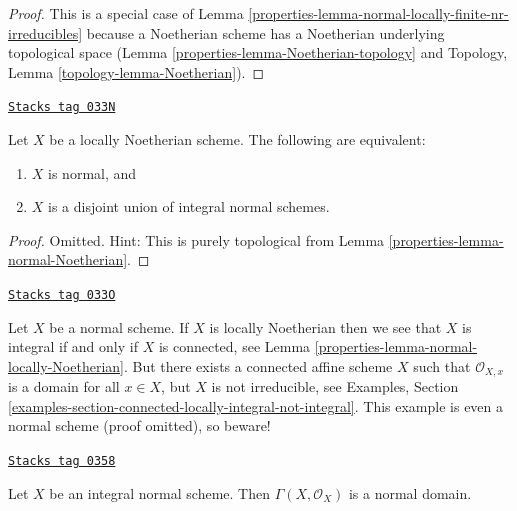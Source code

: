 \begin{proof}

This is a special case of
Lemma \ref{properties-lemma-normal-locally-finite-nr-irreducibles} because a Noetherian
scheme has a Noetherian underlying topological space
(Lemma \ref{properties-lemma-Noetherian-topology}
and
Topology, Lemma \ref{topology-lemma-Noetherian}).
\end{proof}

\begin{lemma}
\label{properties-lemma-normal-locally-Noetherian}
\href{https://stacks.math.columbia.edu/tag/033N}{\texttt{Stacks tag 033N}}

Let $X$ be a locally Noetherian scheme.
The following are equivalent:
\begin{enumerate}
\item $X$ is normal, and
\item $X$ is a disjoint union of integral normal schemes.
\end{enumerate}
\end{lemma}

\begin{proof}

Omitted. Hint: This is purely topological from
Lemma \ref{properties-lemma-normal-Noetherian}.
\end{proof}

\begin{remark}
\label{properties-remark-normal-connected-irreducible}
\href{https://stacks.math.columbia.edu/tag/033O}{\texttt{Stacks tag 033O}}

Let $X$ be a normal scheme. If $X$ is locally Noetherian then we see that
$X$ is integral if and only if $X$ is connected, see
Lemma \ref{properties-lemma-normal-locally-Noetherian}.
But there exists a connected affine scheme $X$ such that
$\mathcal{O}_{X, x}$ is a domain for all $x \in X$, but $X$ is not
irreducible, see Examples, Section
\ref{examples-section-connected-locally-integral-not-integral}.
This example is even a normal scheme (proof omitted), so beware!
\end{remark}

\begin{lemma}
\label{properties-lemma-normal-integral-sections}
\href{https://stacks.math.columbia.edu/tag/0358}{\texttt{Stacks tag 0358}}


Let $X$ be an integral normal scheme.
Then $\Gamma(X, \mathcal{O}_X)$ is a normal domain.
\end{lemma}

